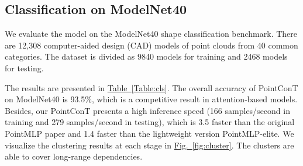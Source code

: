 \documentclass[lettersize,journal]{IEEEtran}
\begin{document}
\subsection{Classification on ModelNet40}

We evaluate the model on the ModelNet40\cite{ModelNet40} shape classification benchmark. There are 
12,308 computer-aided design (CAD) models of point clouds from 40 common categories. 
The dataset is divided as 9840 models for training and 2468 models for testing.

The results are presented in \hyperref[Table:cls]{Table~\ref*{Table:cls}}.  
The overall accuracy of PointConT on ModelNet40 is 93.5\%, which is a competitive result in attention-based models.
Besides, our PointConT presents a high inference speed (166 samples/second in training and 279 samples/second in testing),
which is 3.5 faster than the original PointMLP\cite{pointmlp} paper and 1.4 faster than the lightweight version PointMLP-elite.
We visualize the clustering results at each stage in \hyperref[fig:cluster]{Fig.~\ref*{fig:cluster}}. The clusters are able to cover long-range dependencies. 
\end{document}
